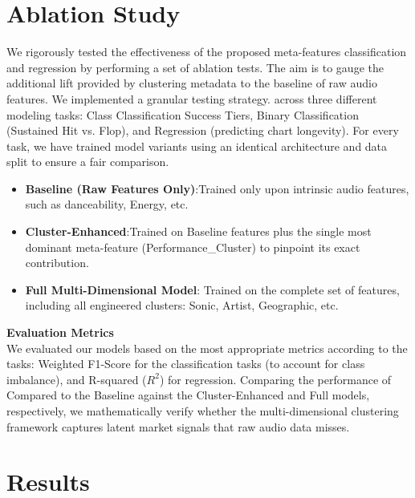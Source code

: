 \documentclass{article}
\begin{document}
\section{Ablation Study}
\vspace{-0.6em}
We rigorously tested the effectiveness of the proposed meta-features classification and regression by performing a set of ablation tests. The aim is to gauge the additional lift provided by
clustering metadata to the baseline of raw audio features. We implemented a granular testing strategy.
across three different modeling tasks: Class Classification Success Tiers, Binary Classification
(Sustained Hit vs. Flop), and Regression (predicting chart longevity). For every task, we have trained model variants using an identical architecture and data split to ensure a fair comparison.
\begin{itemize}[itemsep=0.5ex, topsep=0pt, parsep=0pt, partopsep=0pt, leftmargin=*]
    \item \textbf{Baseline (Raw Features Only)}:Trained only upon intrinsic audio features, such as danceability, Energy, etc.
    \item \textbf{Cluster-Enhanced}:Trained on Baseline features plus the single most dominant meta-feature (Performance\_Cluster) to pinpoint its exact contribution.
    \item \textbf{Full Multi-Dimensional Model}: Trained on the complete set of features, including all engineered clusters: Sonic, Artist, Geographic, etc.
\end{itemize}

\textbf{Evaluation Metrics}\\
We evaluated our models based on the most appropriate metrics according to the tasks: Weighted F1-Score for the classification tasks (to account for class imbalance), and R-squared ($R^2$) for regression. Comparing the performance of
Compared to the Baseline against the Cluster-Enhanced and Full models, respectively, we mathematically verify whether the multi-dimensional clustering framework captures latent market signals that raw audio data misses.

\section{Results}
\vspace{-0.6em}
\end{document}

